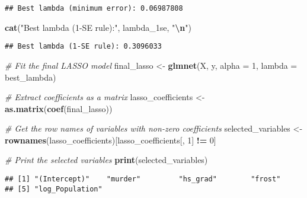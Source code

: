 \documentclass[
]{article}
\newenvironment{Shaded}{\begin{snugshade}}{\end{snugshade}}
\newcommand{\AttributeTok}[1]{\textcolor[rgb]{0.13,0.29,0.53}{#1}}
\newcommand{\CommentTok}[1]{\textcolor[rgb]{0.56,0.35,0.01}{\textit{#1}}}
\newcommand{\ConstantTok}[1]{\textcolor[rgb]{0.56,0.35,0.01}{#1}}
\newcommand{\DecValTok}[1]{\textcolor[rgb]{0.00,0.00,0.81}{#1}}
\newcommand{\FunctionTok}[1]{\textcolor[rgb]{0.13,0.29,0.53}{\textbf{#1}}}
\newcommand{\NormalTok}[1]{#1}
\newcommand{\OtherTok}[1]{\textcolor[rgb]{0.56,0.35,0.01}{#1}}
\newcommand{\SpecialCharTok}[1]{\textcolor[rgb]{0.81,0.36,0.00}{\textbf{#1}}}
\newcommand{\StringTok}[1]{\textcolor[rgb]{0.31,0.60,0.02}{#1}}
\begin{document}
\begin{verbatim}
## Best lambda (minimum error): 0.06987808
\end{verbatim}

\begin{Shaded}
\begin{Highlighting}[]
\FunctionTok{cat}\NormalTok{(}\StringTok{"Best lambda (1{-}SE rule):"}\NormalTok{, lambda\_1se, }\StringTok{"}\SpecialCharTok{\textbackslash{}n}\StringTok{"}\NormalTok{)}
\end{Highlighting}
\end{Shaded}

\begin{verbatim}
## Best lambda (1-SE rule): 0.3096033
\end{verbatim}

\begin{Shaded}
\begin{Highlighting}[]
\CommentTok{\# Fit the final LASSO model}
\NormalTok{final\_lasso }\OtherTok{\textless{}{-}} \FunctionTok{glmnet}\NormalTok{(X, y, }\AttributeTok{alpha =} \DecValTok{1}\NormalTok{, }\AttributeTok{lambda =}\NormalTok{ best\_lambda)}

\CommentTok{\# Extract coefficients as a matrix}
\NormalTok{lasso\_coefficients }\OtherTok{\textless{}{-}} \FunctionTok{as.matrix}\NormalTok{(}\FunctionTok{coef}\NormalTok{(final\_lasso))}

\CommentTok{\# Get the row names of variables with non{-}zero coefficients}
\NormalTok{selected\_variables }\OtherTok{\textless{}{-}} \FunctionTok{rownames}\NormalTok{(lasso\_coefficients)[lasso\_coefficients[, }\DecValTok{1}\NormalTok{] }\SpecialCharTok{!=} \DecValTok{0}\NormalTok{]}

\CommentTok{\# Print the selected variables}
\FunctionTok{print}\NormalTok{(selected\_variables)}
\end{Highlighting}
\end{Shaded}

\begin{verbatim}
## [1] "(Intercept)"    "murder"         "hs_grad"        "frost"         
## [5] "log_Population"
\end{verbatim}

\begin{Shaded}
\end{Shaded}
\end{document}
